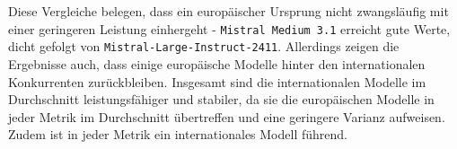 Diese Vergleiche belegen, dass ein europäischer Ursprung nicht zwangsläufig mit einer geringeren Leistung einhergeht - \texttt{Mistral Medium 3.1} erreicht gute Werte, dicht gefolgt von \texttt{Mistral-Large-Instruct-2411}. Allerdings zeigen die Ergebnisse auch, dass einige europäische Modelle hinter den internationalen Konkurrenten zurückbleiben. Insgesamt sind die internationalen Modelle im Durchschnitt leistungsfähiger und stabiler, da sie die europäischen Modelle in jeder Metrik im Durchschnitt übertreffen und eine geringere Varianz aufweisen. Zudem ist in jeder Metrik ein internationales Modell führend.